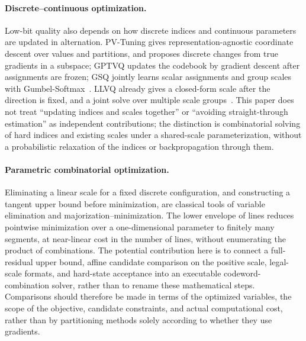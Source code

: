 \paragraph{Discrete--continuous optimization.}
Low-bit quality also depends on how discrete indices and continuous parameters are updated in alternation.
PV-Tuning gives representation-agnostic coordinate descent over values and partitions, and proposes discrete changes from true gradients in a subspace; GPTVQ updates the codebook by gradient descent after assignments are frozen; GSQ jointly learns scalar assignments and group scales with Gumbel-Softmax~\cite{pvtuning,gptvq,gsq}.
LLVQ already gives a closed-form scale after the direction is fixed, and a joint solve over multiple scale groups~\cite{llvq}.
This paper does not treat ``updating indices and scales together'' or ``avoiding straight-through estimation'' as independent contributions; the distinction is combinatorial solving of hard indices and existing scales under a shared-scale parameterization, without a probabilistic relaxation of the indices or backpropagation through them.

\paragraph{Parametric combinatorial optimization.}
Eliminating a linear scale for a fixed discrete configuration, and constructing a tangent upper bound before minimization, are classical tools of variable elimination and majorization--minimization.
The lower envelope of lines reduces pointwise minimization over a one-dimensional parameter to finitely many segments, at near-linear cost in the number of lines, without enumerating the product of combinations.
The potential contribution here is to connect a full-residual upper bound, affine candidate comparison on the positive scale, legal-scale formats, and hard-state acceptance into an executable codeword-combination solver, rather than to rename these mathematical steps.
Comparisons should therefore be made in terms of the optimized variables, the scope of the objective, candidate constraints, and actual computational cost, rather than by partitioning methods solely according to whether they use gradients.

